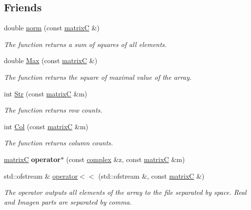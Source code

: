 \subsection*{Friends}
\begin{DoxyCompactItemize}
\item 
\mbox{\label{classmatrix_c_acae2edb23217265c061f306c52912c19}} 
double \mbox{\hyperlink{classmatrix_c_acae2edb23217265c061f306c52912c19}{norm}} (const \mbox{\hyperlink{classmatrix_c}{matrixC}} \&)
\begin{DoxyCompactList}\small\item\em The function returns a sum of squares of all elements. \end{DoxyCompactList}\item 
\mbox{\label{classmatrix_c_ac39f0a59997bb6678063cebbdada2b82}} 
double \mbox{\hyperlink{classmatrix_c_ac39f0a59997bb6678063cebbdada2b82}{Max}} (const \mbox{\hyperlink{classmatrix_c}{matrixC}} \&)
\begin{DoxyCompactList}\small\item\em The function returns the square of maximal value of the array. \end{DoxyCompactList}\item 
int \mbox{\hyperlink{classmatrix_c_a899bdb2aece2b65c6ef7b6fadf4a124b}{Str}} (const \mbox{\hyperlink{classmatrix_c}{matrixC}} \&m)
\begin{DoxyCompactList}\small\item\em The function returns row counts. \end{DoxyCompactList}\item 
int \mbox{\hyperlink{classmatrix_c_a760a278d008e2717135156531da1450b}{Col}} (const \mbox{\hyperlink{classmatrix_c}{matrixC}} \&m)
\begin{DoxyCompactList}\small\item\em The function returns column counts. \end{DoxyCompactList}\item 
\mbox{\label{classmatrix_c_a65ec7d14c0de729285d48fa94749dcee}} 
\mbox{\hyperlink{classmatrix_c}{matrixC}} {\bfseries operator$\ast$} (const \mbox{\hyperlink{classcomplex}{complex}} \&z, const \mbox{\hyperlink{classmatrix_c}{matrixC}} \&m)
\item 
\mbox{\label{classmatrix_c_ab321eae7cb92218cffee53cfd151e167}} 
std\+::ofstream \& \mbox{\hyperlink{classmatrix_c_ab321eae7cb92218cffee53cfd151e167}{operator$<$$<$}} (std\+::ofstream \&, const \mbox{\hyperlink{classmatrix_c}{matrixC}} \&)
\begin{DoxyCompactList}\small\item\em The operator outputs all elements of the array to the file separated by space. Real and Imagen parts are separated by comma. \end{DoxyCompactList}\end{DoxyCompactItemize}


